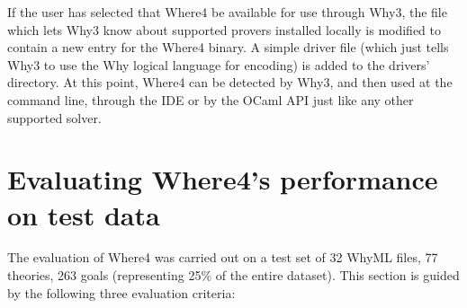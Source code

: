 \documentclass[runningheads,a4paper]{llncs}
\begin{document}
If the user has selected that \textsf{Where4} be available for use through \textsf{Why3}, the file which lets \textsf{Why3} know about supported provers installed locally is modified to contain a new entry for the \textsf{Where4} binary. A simple driver file (which just tells \textsf{Why3} to use the Why logical language for encoding) is added to the drivers' directory. At this point, \textsf{Where4} can be detected by \textsf{Why3}, and then used at the command line, through the IDE or by the OCaml API just like any other supported solver. 

\section{Evaluating \textsf{Where4}'s performance on test data}
\label{sec:eval}



The evaluation of \textsf{Where4} was carried out on a test set of 32 WhyML files, 77 theories, 263 goals (representing 25\% of the entire dataset). This section is guided by the following three evaluation criteria:

\end{document}
